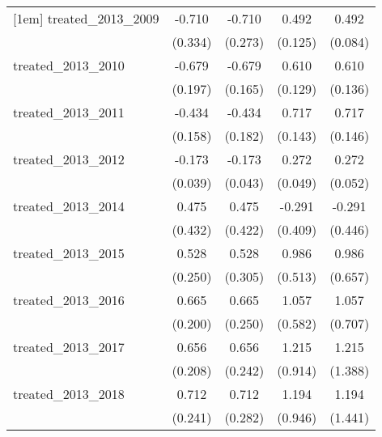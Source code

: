 {\begin{tabular}{l*{4}{c}}
[1em]
treated\_2013\_2009&      -0.710\sym{*}  &      -0.710\sym{**} &       0.492\sym{***}&       0.492\sym{***}\\
            &     (0.334)         &     (0.273)         &     (0.125)         &     (0.084)         \\
[1em]
treated\_2013\_2010&      -0.679\sym{***}&      -0.679\sym{***}&       0.610\sym{***}&       0.610\sym{***}\\
            &     (0.197)         &     (0.165)         &     (0.129)         &     (0.136)         \\
[1em]
treated\_2013\_2011&      -0.434\sym{**} &      -0.434\sym{*}  &       0.717\sym{***}&       0.717\sym{***}\\
            &     (0.158)         &     (0.182)         &     (0.143)         &     (0.146)         \\
[1em]
treated\_2013\_2012&      -0.173\sym{***}&      -0.173\sym{***}&       0.272\sym{***}&       0.272\sym{***}\\
            &     (0.039)         &     (0.043)         &     (0.049)         &     (0.052)         \\
[1em]
treated\_2013\_2014&       0.475         &       0.475         &      -0.291         &      -0.291         \\
            &     (0.432)         &     (0.422)         &     (0.409)         &     (0.446)         \\
[1em]
treated\_2013\_2015&       0.528\sym{*}  &       0.528         &       0.986         &       0.986         \\
            &     (0.250)         &     (0.305)         &     (0.513)         &     (0.657)         \\
[1em]
treated\_2013\_2016&       0.665\sym{***}&       0.665\sym{**} &       1.057         &       1.057         \\
            &     (0.200)         &     (0.250)         &     (0.582)         &     (0.707)         \\
[1em]
treated\_2013\_2017&       0.656\sym{**} &       0.656\sym{**} &       1.215         &       1.215         \\
            &     (0.208)         &     (0.242)         &     (0.914)         &     (1.388)         \\
[1em]
treated\_2013\_2018&       0.712\sym{**} &       0.712\sym{*}  &       1.194         &       1.194         \\
            &     (0.241)         &     (0.282)         &     (0.946)         &     (1.441)         \\

\end{tabular}}
